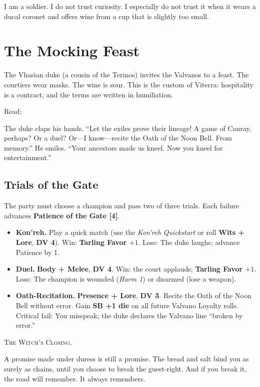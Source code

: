 \documentclass[11pt,a5paper]{book}
\newcommand{\sb}[1]{\textbf{SB #1}}
\newcommand{\dv}[1]{\textbf{DV #1}}
\newcommand{\timer}[1]{\textbf{[#1]}}
\newcommand{\condition}[1]{\textit{#1}}
\newenvironment{witchclosing}
  {\begin{quoting}[font={small\itshape}, leftmargin=2em, rightmargin=2em]\noindent\textsc{The Witch's Closing.}\par}
  {\end{quoting}}
\begin{document}
\lettrine{I}{} am a soldier. I do not trust curiosity. I especially do not trust it when it wears a ducal coronet and offers wine from a cup that is slightly too small.

\section*{The Mocking Feast}

The Vhasian duke (a cousin of the Terinos) invites the Valvanos to a feast. The courtiers wear masks. The wine is sour. This is the custom of Viterra: hospitality is a contract, and the terms are written in humiliation.

Read:
\begin{quoting}
The duke claps his hands. ``Let the exiles prove their lineage! A game of Canray, perhaps? Or a duel? Or---I know---recite the Oath of the Noon Bell. From memory.'' He smiles. ``Your ancestors made us kneel. Now you kneel for entertainment.''
\end{quoting}

\subsection*{Trials of the Gate}

The party must choose a champion and pass two of three trials. Each failure advances \textbf{Patience of the Gate \timer{4}}.

\begin{itemize}[leftmargin=*]
\item \textbf{Kon'reh.} Play a quick match (use the \textit{Kon'reh Quickstart} or roll \textbf{Wits + Lore}, \dv{4}). Win: \textbf{Tarling Favor $+1$}. Loss: The duke laughs; advance Patience by 1.
\item \textbf{Duel.} \textbf{Body + Melee}, \dv{4}. Win: the court applauds; \textbf{Tarling Favor $+1$}. Loss: The champion is wounded (\condition{Harm 1}) or disarmed (lose a weapon).
\item \textbf{Oath-Recitation.} \textbf{Presence + Lore}, \dv{3}. Recite the Oath of the Noon Bell without error. Gain \sb{+1 die} on all future Valvano Loyalty rolls. Critical fail: You misspeak; the duke declares the Valvano line ``broken by error.''
\end{itemize}

\begin{witchclosing}
A promise made under duress is still a promise. The bread and salt bind you as surely as chains, until you choose to break the guest-right. And if you break it, the road will remember. It always remembers.
\end{witchclosing}
\end{document}
